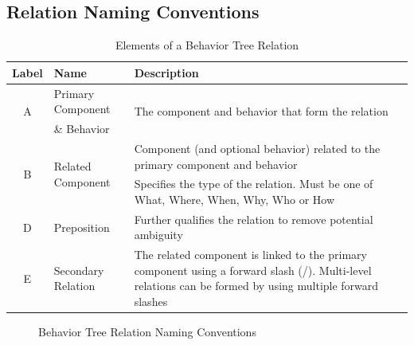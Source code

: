 \documentclass[]{article}
\begin{document}
\clearpage

\subsection{Relation Naming Conventions}

\begin{table}[hb]
\begin{center}
\begin{small}
\begin{tabular}{|c|l|p{}|}
 \hline
 \textbf{Label} & \textbf{Name} & \textbf{Description} \\ 
 \hline
 \hline
 \multirow{2}{*}{A} & Primary Component & \multirow{2}{*}{The component and behavior that form the relation} \\ 
  & \& Behavior & \\
 \hline
 \multirow{2}{*}{B} & \multirow{2}{*}{Related Component} & Component (and optional behavior) related to the primary component and behavior \\ 
 \hline
 \multirow{2}{*}{C} & \multirow{2}{*}{Qualifier} & Specifies the type of the relation. Must be one of What, Where, When, Why, Who or How \\
 \hline
 D & Preposition & Further qualifies the relation to remove potential ambiguity \\
 \hline
 \multirow{3}{*}{E} & \multirow{3}{*}{Secondary Relation} & The related component is linked to the primary component using a forward slash (/). Multi-level relations can be formed by using multiple forward slashes\\
 \hline
\end{tabular}
\end{small}
\end{center}
\caption{Elements of a Behavior Tree Relation}
\label{tbl:RelationElements}
\end{table}

\begin{figure}[hb]
 \centering
 \caption{Behavior Tree Relation Naming Conventions}
 \label{fig:RelationNaming}
\end{figure}
\end{document}
